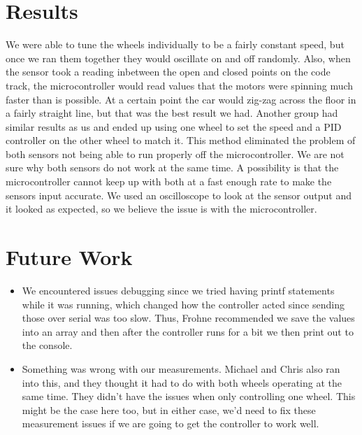 \documentclass{article}
\begin{document}
\section{Results}
We were able to tune the wheels individually to be a fairly constant speed, but once we ran them together they would oscillate on and off randomly. Also, when the sensor took a reading inbetween the open and closed points on the code track, the microcontroller would read values that the motors were spinning much faster than is possible. At a certain point the car would zig-zag across the floor in a fairly straight line, but that was the best result we had. Another group had similar results as us and ended up using one wheel to set the speed and a PID controller on the other wheel to match it. This method eliminated the problem of both sensors not being able to run properly off the microcontroller. We are not sure why both sensors do not work at the same time. A possibility is that the microcontroller cannot keep up with both at a fast enough rate to make the sensors input accurate. We used an oscilloscope to look at the sensor output and it looked as expected, so we believe the issue is with the microcontroller.

\section{Future Work}
\begin{itemize}
\item We encountered issues debugging since we tried having printf statements while it was running, which changed how the controller acted since sending those over serial was too slow. Thus, Frohne recommended we save the values into an array and then after the controller runs for a bit we then print out to the console.
\item Something was wrong with our measurements. Michael and Chris also ran into this, and they thought it had to do with both wheels operating at the same time. They didn't have the issues when only controlling one wheel. This might be the case here too, but in either case, we'd need to fix these measurement issues if we are going to get the controller to work well.
\end{itemize}
\end{document}
